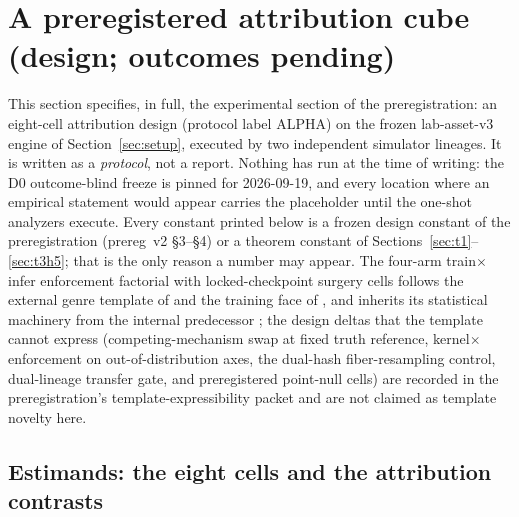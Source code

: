 \section{A preregistered attribution cube (design; outcomes pending)}
\label{sec:cube}

\begingroup\sloppy

This section specifies, in full, the experimental section of the
preregistration: an eight-cell attribution design (protocol label ALPHA) on the
frozen lab-asset-v3 engine of Section~\ref{sec:setup}, executed by two
independent simulator lineages. It is written as a \emph{protocol}, not a
report. Nothing has run at the time of writing: the D0 outcome-blind freeze is
pinned for 2026-09-19, and every location where an empirical statement would
appear carries the placeholder \RESULTSPENDING{} until the one-shot analyzers
execute. Every constant printed below is a frozen design constant of the
preregistration (prereg~v2 \S3--\S4) or a theorem constant of
Sections~\ref{sec:t1}--\ref{sec:t3h5}; that is the only reason a number may
appear. The four-arm train$\times$infer enforcement factorial with
locked-checkpoint surgery cells follows the external genre template of
\citet{duruisseaux2024} and the training face of \citet{solverinloop2020}, and
inherits its statistical machinery from the internal predecessor
\citep{paperd}; the design deltas that the template cannot express
(competing-mechanism swap at fixed truth reference, kernel$\times$enforcement
on out-of-distribution axes, the dual-hash fiber-resampling control,
dual-lineage transfer gate, and preregistered point-null cells) are recorded
in the preregistration's template-expressibility packet and are not claimed as
template novelty here.

\subsection{Estimands: the eight cells and the attribution contrasts}
\label{sec:cube-estimands}

